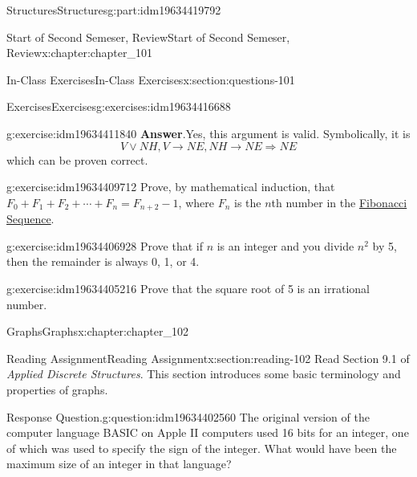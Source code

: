 \documentclass[oneside,10pt,]{book}
\newcommand{\blocktitlefont}{\relax}
\numberwithin{equation}{section}
\begin{document}
\begin{partptx}{Structures}{}{Structures}{}{}{g:part:idm19634419792}
\begin{chapterptx}{Start of Second Semeser, Review}{}{Start of Second Semeser, Review}{}{}{x:chapter:chapter_101}
\begin{sectionptx}{In-Class Exercises}{}{In-Class Exercises}{}{}{x:section:questions-101}
\begin{exercises-subsection-numberless}{Exercises}{}{Exercises}{}{}{g:exercises:idm19634416688}
\begin{exercisegroup}
\begin{divisionexerciseeg}{3}{}{}{g:exercise:idm19634411840}
\noindent\textbf{\blocktitlefont Answer}.\hypertarget{g:answer:idm19634410560}{}\quad{}Yes, this argument is valid.  Symbolically, it is%
\begin{equation*}
V \lor NH, V\rightarrow NE, NH\rightarrow NE \Rightarrow NE
\end{equation*}
which can be proven correct.%
\end{divisionexerciseeg}%
\begin{divisionexerciseeg}{4}{}{}{g:exercise:idm19634409712}%
Prove, by mathematical induction, that \(F_0 + F_1 + F_2 + \cdots + F_{n} = F_{n+2} - 1\), where \(F_n\) is the \(n\)th number in the \hyperref[x:section:def-fibonacci-sequence]{Fibonacci Sequence}.%
\end{divisionexerciseeg}%
\begin{divisionexerciseeg}{5}{}{}{g:exercise:idm19634406928}%
Prove that if \(n\) is an integer and you divide \(n^2\) by 5, then the remainder is always 0, 1, or 4.%
\end{divisionexerciseeg}%
\begin{divisionexerciseeg}{6}{}{}{g:exercise:idm19634405216}%
Prove that the square root of 5 is an irrational number.%
\end{divisionexerciseeg}%
\end{exercisegroup}
\par\medskip\noindent
\end{exercises-subsection-numberless}
\end{sectionptx}
\end{chapterptx}
%
\typeout{************************************************}
\typeout{************************************************}
%
\begin{chapterptx}{Graphs}{}{Graphs}{}{}{x:chapter:chapter_102}
%
%
%
\typeout{************************************************}
\typeout{************************************************}
%
\begin{sectionptx}{Reading Assignment}{}{Reading Assignment}{}{}{x:section:reading-102}
Read Section 9.1 of \emph{Applied Discrete Structures}. This section introduces some basic terminology and properties of graphs.%
\begin{question}{Response Question.}{g:question:idm19634402560}%
The original version of the computer language BASIC on Apple II computers used 16 bits for an integer, one of which was used to specify the sign of the integer.  What would have been the maximum size of an integer in that language?%

\end{question}
\end{sectionptx}
\end{chapterptx}
\end{partptx}
\end{document}
